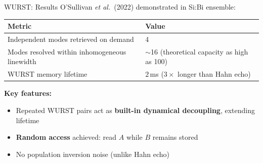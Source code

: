 \documentclass[10pt]{beamer}
\newcommand{\lighthline}{\arrayrulecolor{gray!35}\hline\arrayrulecolor{black}}
\begin{document}
\begin{frame}{WURST: Results}
    O'Sullivan \textit{et al.}\ (2022) demonstrated in Si:Bi ensemble:

    \vspace{0.1cm}
    \begin{center}
    \scriptsize
    \renewcommand{\arraystretch}{1.5}
    \begin{tabular}{ll}
        \toprule
        \textbf{Metric} & \textbf{Value} \\
        \midrule
        Independent modes retrieved on demand & 4 \\
        \lighthline
        Modes resolved within inhomogeneous linewidth & $\sim$16 (theoretical capacity as high as 100) \\
        \lighthline
        WURST memory lifetime & $2$\,ms ($3\times$ longer than Hahn echo)\\
        \bottomrule
    \end{tabular}
    \end{center}

    \vspace{0.2cm}
    \textbf{Key features:}
    \begin{itemize}
        \item<2-> Repeated WURST pairs act as \textbf{built-in dynamical decoupling}, extending lifetime
        \item<3-> \textbf{Random access} achieved: read $A$ while $B$ remains stored
        \item<4-> No population inversion noise (unlike Hahn echo)
    \end{itemize}
\end{frame}
\end{document}
